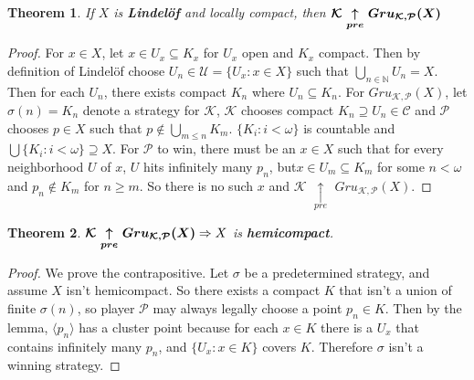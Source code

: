\documentclass{amsart}
\theoremstyle{plain}
\newtheorem{theorem}{Theorem}
\theoremstyle{definition}
\theoremstyle{remark}
\begin{document}
	\begin{theorem}
		If $X$ is \textbf{Lindel\"of} and locally compact, then $\boldsymbol{\mathcal{K}$ $\underset{pre}{\uparrow}$ $Gru_{\mathcal{K}, \mathcal{P}} (X)}$
	\end{theorem}
	\begin{proof}
		For $x \in X$, let $x \in U_x \subseteq K_x$ for $U_x$ open and $K_x$ compact. Then by definition of Lindel\"of choose $U_n \in \mathcal{U} = \lbrace U_x : x \in X \rbrace$ such that $\underset{n \in \mathbb{N}}{\bigcup}U_n = X$. Then for each $U_n$, there exists compact $K_n$ where $U_n \subseteq K_n$. \newline
		For $Gru_{\mathcal{K}, \mathcal{P}} (X)$, let $\sigma(n) = K_n$ denote a strategy for $\mathcal{K}$, $\mathcal{K}$ chooses compact $K_n \supseteq U_n \in \mathcal{C}$ and $\mathcal{P}$ chooses $p \in X$ such that $p \not\in \underset{m \leq n}{\bigcup}K_m$. $\lbrace K_i : i < \omega \rbrace$ is countable and $\bigcup \lbrace K_i : i < \omega \rbrace \supseteq X$. For $\mathcal{P}$ to win, there must be an $x \in X$ such that for every neighborhood $U$ of $x$, $U$ hits infinitely many $p_n$, but$x \in U_m \subseteq K_m$ for some $n < \omega$ and $p_n \not\in K_m$ for $n \geq m$. So there is no such $x$ and $\mathcal{K}$ $\underset{pre}{\uparrow}$ $Gru_{\mathcal{K}, \mathcal{P}} (X)$.
	\end{proof}

	\begin{theorem}
		$\boldsymbol{\mathcal{K}$ $\underset{pre}{\uparrow}$ $Gru_{\mathcal{K}, \mathcal{P}} (X)} \Rightarrow X$ is \textbf{hemicompact}.
	\end{theorem}
	\begin{proof}
		We prove the contrapositive. Let $\sigma$ be a predetermined strategy, and assume $X$ isn't hemicompact. So there exists a compact $K$ that isn't a union of finite $\sigma(n)$, so player $\mathcal{P}$ may always legally choose a point $p_n \in K$. Then by the lemma, $\langle p_n \rangle$ has a cluster point because for each $x \in K$ there is a $U_x$ that contains infinitely many $p_n$, and $\lbrace U_x : x \in K \rbrace$ covers $K$. Therefore $\sigma$ isn't a winning strategy.
	\end{proof}



	
\end{document}
